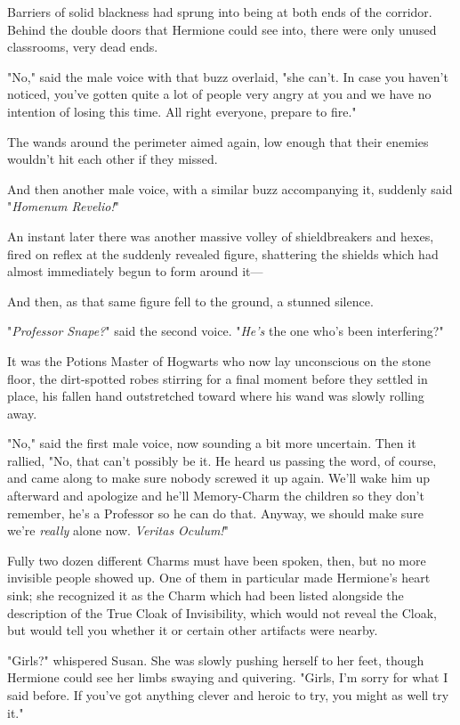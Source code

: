 Barriers of solid blackness had sprung into being at both ends of the corridor. 
Behind the double doors that Hermione could see into, there were only unused 
classrooms, very dead ends.

"No," said the male voice with that buzz overlaid, "she can't. In case you 
haven't noticed, you've gotten quite a lot of people very angry at you and we 
have no intention of losing this time. All right everyone, prepare to fire."

The wands around the perimeter aimed again, low enough that their enemies 
wouldn't hit each other if they missed.

And then another male voice, with a similar buzz accompanying it, suddenly said 
"\emph{Homenum Revelio!}"

An instant later there was another massive volley of shieldbreakers and hexes, 
fired on reflex at the suddenly revealed figure, shattering the shields which 
had almost immediately begun to form around it---

And then, as that same figure fell to the ground, a stunned silence.

"\emph{Professor Snape?}" said the second voice. "\emph{He's} the one who's 
been interfering?"

It was the Potions Master of Hogwarts who now lay unconscious on the stone 
floor, the dirt-spotted robes stirring for a final moment before they settled 
in place, his fallen hand outstretched toward where his wand was slowly rolling 
away.

"No," said the first male voice, now sounding a bit more uncertain. Then it 
rallied, "No, that can't possibly be it. He heard us passing the word, of 
course, and came along to make sure nobody screwed it up again. We'll wake him 
up afterward and apologize and he'll Memory-Charm the children so they don't 
remember, he's a Professor so he can do that. Anyway, we should make sure we're 
\emph{really} alone now. \emph{Veritas Oculum!}"

Fully two dozen different Charms must have been spoken, then, but no more 
invisible people showed up. One of them in particular made Hermione's heart 
sink; she recognized it as the Charm which had been listed alongside the 
description of the True Cloak of Invisibility, which would not reveal the 
Cloak, but would tell you whether it or certain other artifacts were nearby.

"Girls?" whispered Susan. She was slowly pushing herself to her feet, though 
Hermione could see her limbs swaying and quivering. "Girls, I'm sorry for what 
I said before. If you've got anything clever and heroic to try, you might as 
well try it."


